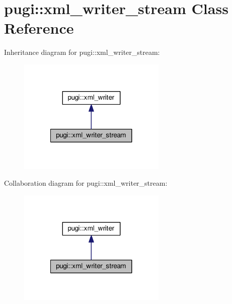 \hypertarget{classpugi_1_1xml__writer__stream}{\section{pugi\+:\+:xml\+\_\+writer\+\_\+stream Class Reference}
\label{classpugi_1_1xml__writer__stream}
}


Inheritance diagram for pugi\+:\+:xml\+\_\+writer\+\_\+stream\+:
\nopagebreak
\begin{figure}[H]
\begin{center}
\leavevmode
\includegraphics[width=200pt]{classpugi_1_1xml__writer__stream__inherit__graph}
\end{center}
\end{figure}


Collaboration diagram for pugi\+:\+:xml\+\_\+writer\+\_\+stream\+:
\nopagebreak
\begin{figure}[H]
\begin{center}
\leavevmode
\includegraphics[width=200pt]{classpugi_1_1xml__writer__stream__coll__graph}
\end{center}
\end{figure}
